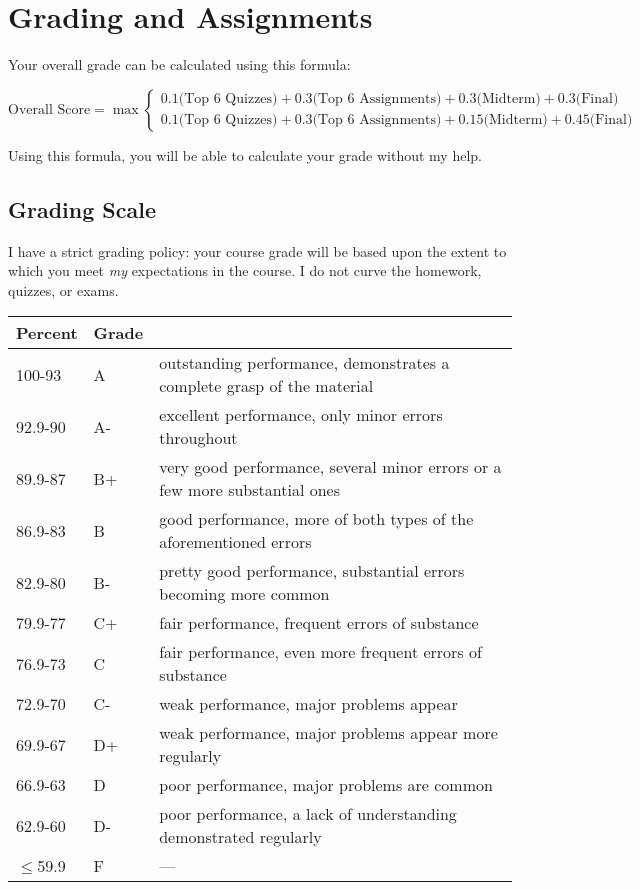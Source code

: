 \documentclass[11pt]{paper}
\begin{document}
\section{Grading and Assignments}

Your overall grade can be calculated using this formula:

  \begin{equation*}
    \text{Overall Score} = \max
    \begin{cases}
      0.1 \text{(Top 6 Quizzes)} + 0.3 \text{(Top 6 Assignments)} + 0.3 \text{(Midterm)} + 0.3 \text{(Final)} \\
      0.1 \text{(Top 6 Quizzes)} + 0.3 \text{(Top 6 Assignments)} + 0.15 \text{(Midterm)} + 0.45 \text{(Final)}
    \end{cases}
  \end{equation*}

Using this formula, you will be able to calculate your grade without my help.

\subsection{Grading Scale}

I have a strict grading policy: your course grade will be based upon the extent to which you meet \textit{my} expectations in the course. I do not curve the homework, quizzes, or exams.

\begin{flushleft}
\begin{tabular}{ l  l  l }\hline
 Percent & Grade & \\\hline 
 100-93 &  A & outstanding performance, demonstrates a complete grasp of the material\\
 92.9-90 & A- & excellent performance, only minor errors throughout\\
 89.9-87 & B+ & very good performance, several minor errors or a few more substantial ones\\
 86.9-83 & B & good performance, more of both types of the aforementioned errors\\
 82.9-80 & B- & pretty good performance, substantial errors becoming more common\\
 79.9-77 & C+ & fair performance, frequent errors of substance \\
 76.9-73 & C & fair performance, even more frequent errors of substance\\
 72.9-70 & C- & weak performance, major problems appear\\
 69.9-67 & D+ & weak performance, major problems appear more regularly\\
 66.9-63 & D & poor performance, major problems are common\\
 62.9-60 & D- & poor performance, a lack of understanding demonstrated regularly \\
 $\leq$59.9 & F & ---\\\hline
\end{tabular}
\end{flushleft}
\end{document}
